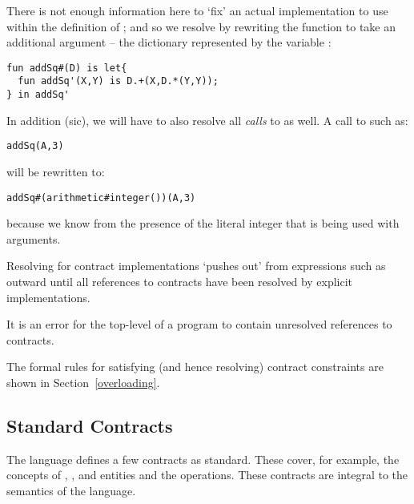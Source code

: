 There is not enough information here to `fix' an actual implementation to use within the definition of ; and so we resolve by rewriting the  function to take an additional argument -- the  dictionary represented by the variable :
\begin{lstlisting}
fun addSq#(D) is let{
  fun addSq'(X,Y) is D.+(X,D.*(Y,Y));
} in addSq'
\end{lstlisting}
In addition (sic), we will have to also resolve all \emph{calls} to  as well. A call to  such as:
\begin{lstlisting}
addSq(A,3)
\end{lstlisting}
will be rewritten to:
\begin{lstlisting}
addSq#(arithmetic#integer())(A,3)
\end{lstlisting}
because we know from the presence of the literal integer that  is being used with  arguments.

Resolving for contract implementations `pushes out' from expressions such as  outward until all references to contracts have been resolved by explicit implementations.
\begin{aside}
It is an error for the top-level of a program to contain unresolved references to contracts.
\end{aside}

The formal rules for satisfying (and hence resolving) contract constraints are shown in Section~\vref{overloading}.


\subsection{Standard Contracts}
\label{standardContracts}

The language defines a few contracts as standard. These cover, for example, the concepts of , , and  entities and the  operations. These contracts are integral to the semantics of the language.

